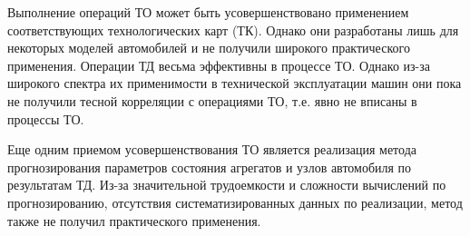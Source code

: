 \documentclass[../nirs.tex]{subfiles}
\begin{document}
Выполнение операций ТО может быть усовершенствовано применением соответствующих
технологических карт (ТК). Однако они разработаны лишь для некоторых моделей
автомобилей и не получили широкого практического применения.
Операции ТД весьма эффективны в процессе ТО. Однако из-за широкого спектра их
применимости в технической эксплуатации машин они пока не получили тесной
корреляции с операциями ТО, т.е. явно не вписаны в процессы ТО.

Еще одним приемом усовершенствования ТО является реализация метода
прогнозирования параметров состояния агрегатов и узлов автомобиля по результатам
ТД. Из-за значительной трудоемкости и сложности вычислений по прогнозированию,
отсутствия систематизированных данных по реализации, метод также не получил
практического применения.
\end{document}
